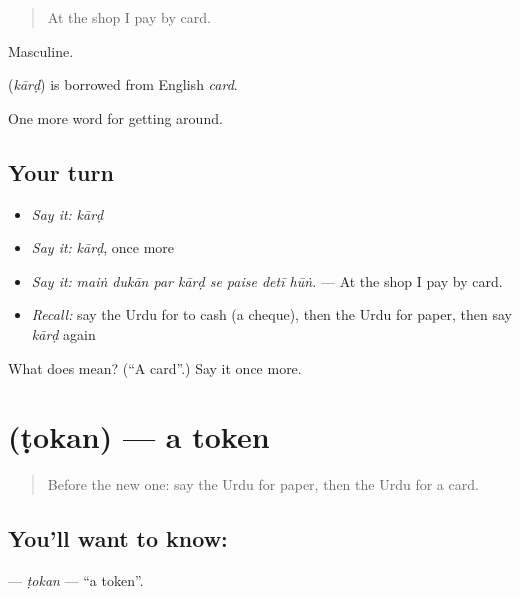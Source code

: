 \begin{quote}
At the shop I pay by card.
\end{quote}

Masculine.

\begin{cousinweb}
\textbf{} (\emph{kārḍ}) is borrowed from English \emph{card}.
\end{cousinweb}

\begin{grammarlens}[title={What you've built}]
One more word for getting around.
\end{grammarlens}

\subsection*{Your turn}
\begin{itemize}
\raggedright
  \item \emph{Say it:} \emph{kārḍ}
  \item \emph{Say it:} \emph{kārḍ}, once more
  \item \emph{Say it:} \emph{maiṅ dukān par kārḍ se paise detī hūṅ.} — At the shop I pay by card.
  \item \emph{Recall:} say the Urdu for to cash (a cheque), then the Urdu for paper, then say \emph{kārḍ} again
\end{itemize}

\begin{tcolorbox}[breakable,colback=teal!4,colframe=teal!35!black,title={Before you move on}]
What does  mean? (\textquotedblleft{}A card\textquotedblright{}.) Say it once more.
\end{tcolorbox}
\section[\texorpdfstring{\ur{ٹوکن} (ṭokan)}{ٹوکن (ṭokan)}]{ (ṭokan) — a token}

\label{lesson:UR-C421-tokan}



\begin{quote}
Before the new one: say the Urdu for paper, then the Urdu for a card.
\end{quote}

\subsection*{You'll want to know: }
\textbf{} — \emph{ṭokan} — \textquotedblleft{}a token\textquotedblright{}.

